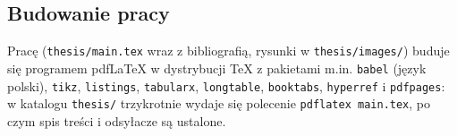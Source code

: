 \documentclass[a4paper,12pt]{article}
\begin{document}
\subsection{Budowanie pracy}\label{sec:zal_praca}
Pracę (\texttt{thesis/main.tex} wraz z bibliografią, rysunki w \texttt{thesis/images/}) buduje się programem pdfLaTeX w dystrybucji TeX z pakietami m.in. \texttt{babel} (język polski), \texttt{tikz}, \texttt{listings}, \texttt{tabularx}, \texttt{longtable}, \texttt{booktabs}, \texttt{hyperref} i \texttt{pdfpages}: w katalogu \texttt{thesis/} trzykrotnie wydaje się polecenie \texttt{pdflatex main.tex}, po czym spis treści i odsyłacze są ustalone.
\end{document}
